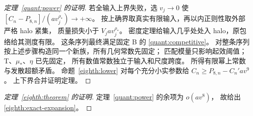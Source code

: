 \begin{proof}[定理~\ref{quant:power} 的证明]
若全输入上界失败，选 \(v_j\to0\) 使
\([C_n-P_{8,n}]/(av_j^{\rho_*})\to+\infty\)。
按上确界取真实有限输入，再以内正则性取外部严格 halo 紧集，
质量损失小于 \(V_jav_j^{\rho_*}\)。
密度定理给输入几乎处处入 halo，原包络给其测度有限。
这条序列最终满足固定 B 的 \eqref{quant:competitive}。
对整条序列按上述步骤构造同一个新族，所有几何常数先固定；
匹配模量只影响起效阈值；T、\(\mu_*\)、\(\eta\) 已先固定，
所有数值常数独立于输入和尺度跨度。
所得有限幂上常数与发散超额矛盾。
命题~\ref{eighth:lower} 对每个充分小实参数给
\(C_n\ge P_{8,n}-C_n'av^9\)。
上下界合并证明定理。
\end{proof}

\begin{proof}[定理~\ref{eighth:theorem} 的证明]
定理~\ref{quant:power} 的余项为 \(o(av^8)\)，
故给出 \eqref{eighth:exact-expansion}。
\end{proof}
